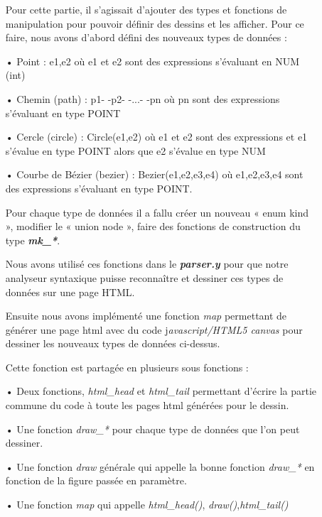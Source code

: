 \documentclass{article}
\begin{document}
\begin{description}
\begin{itemize}
Pour cette partie, il s'agissait d'ajouter des types et fonctions de manipulation pour pouvoir définir des dessins et les afficher. Pour ce faire, nous avons d'abord défini des nouveaux types de données :
	
\bigskip

\item[•] Point : {e1,e2} où e1 et e2 sont des expressions s'évaluant en NUM (int)
\bigskip
\item[•] Chemin (path) : p1- -p2- -...- -pn    où pn sont des expressions s'évaluant en type POINT
\bigskip
\item[•] Cercle (circle) : Circle(e1,e2) où e1 et e2 sont des expressions et e1
s'évalue en type POINT alors que e2 s'évalue en type NUM
\bigskip
\item[•] Courbe de Bézier (bezier) : Bezier(e1,e2,e3,e4) où e1,e2,e3,e4 sont des expressions s'évaluant en type POINT.
\bigskip
 
 Pour chaque type de données il a fallu créer un nouveau « enum kind », modifier le « union node », faire des fonctions de construction du type \textbf{\emph{mk\_*}}.
 
 
\bigskip
Nous avons utilisé ces fonctions dans le \textbf{\emph{parser.y}} pour que notre analyseur syntaxique puisse reconnaître et dessiner ces types de données sur une page HTML.


\bigskip
Ensuite nous avons implémenté une fonction \emph{map} permettant de générer une page html avec du code j\emph{avascript/HTML5 canvas} pour dessiner les nouveaux types de données ci-dessus.


\bigskip



Cette fonction est partagée en plusieurs sous fonctions :



\bigskip

\item[•] Deux fonctions, \emph{html\_head} et \emph{html\_tail} permettant d'écrire la partie commune du code à toute les pages html générées pour le dessin. 
\bigskip
\item[•] Une fonction \emph{draw\_*} pour chaque type de données que l'on peut dessiner.
\bigskip
\item[•] Une fonction \emph{draw} générale qui appelle la bonne fonction \emph{draw\_*} en fonction de la figure passée en paramètre.
\bigskip
\item[•] Une fonction \emph{map} qui appelle \emph{html\_head()}, \emph{draw()},\emph{html\_tail()}




\end{itemize}
\end{description}
\end{document}
